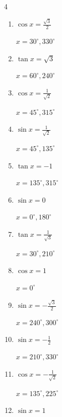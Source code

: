 \begin{multicols}{4}
\begin{enumerate}
        $\displaystyle x = 225^{\circ} , 315^{\circ}$

  \item $\displaystyle \cos{x}  = \frac{\sqrt{3}}{2}$

        $\displaystyle x = 30^{\circ} , 330^{\circ}$

  \item $\displaystyle \tan{x}  = \sqrt{3}$

        $\displaystyle x = 60^{\circ} , 240^{\circ}$

  \item $\displaystyle \cos{x}  = \frac{1}{\sqrt{2}}$

        $\displaystyle x = 45^{\circ} , 315^{\circ}$

  \item $\displaystyle \sin{x}  = \frac{1}{\sqrt{2}}$

        $\displaystyle x = 45^{\circ} , 135^{\circ}$

  \item $\displaystyle \tan{x}  = -1$

        $\displaystyle x = 135^{\circ} , 315^{\circ}$

  \item $\displaystyle \sin{x}  = 0$

        $\displaystyle x = 0^{\circ} , 180^{\circ}$

  \item $\displaystyle \tan{x}  = \frac{1}{\sqrt{3}}$

        $\displaystyle x = 30^{\circ} , 210^{\circ}$

  \item $\displaystyle \cos{x}  = 1$

        $\displaystyle x = 0^{\circ}$

\columnbreak %

  \item $\displaystyle \sin{x}  = -\frac{\sqrt{3}}{2}$

        $\displaystyle x = 240^{\circ} , 300^{\circ}$

  \item $\displaystyle \sin{x}  = -\frac{1}{2}$

        $\displaystyle x = 210^{\circ} , 330^{\circ}$

  \item $\displaystyle \cos{x}  = -\frac{1}{\sqrt{2}}$

        $\displaystyle x = 135^{\circ} , 225^{\circ}$

  \item $\displaystyle \sin{x}  = 1$


\end{enumerate}
\end{multicols}
